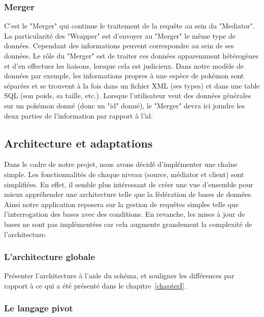 \subsubsection{Merger}
C'est le "Merger" qui continue le traitement de la requête au sein du "Mediator". La particularité des "Wrapper" est d'envoyer au "Merger" le même type de données. Cependant des informations peuvent correspondre au sein de ses données. Le rôle du "Merger" est de traiter ces données apparemment hétérogènes et d'en effectuer les liaisons, lorsque cela est judicieux. Dans notre modèle de données par exemple, les informations propres à une espèce de pokémon sont séparées et se trouvent à la fois dans un fichier XML (ses types) et dans une table SQL (son poids, sa taille, etc.). Lorsque l'utilisateur veut des données générales sur un pokémon donné (donc un "id" donné), le "Merger" devra ici joindre les deux parties de l'information par rapport à l'id. 

\subsection{Architecture et adaptations}

Dans le cadre de notre projet, nous avons décidé d'implémenter une chaîne simple. Les fonctionnalités de chaque niveau (source, médiator et client) sont simplifiées. En effet, il semble plus intéressant de créer une vue d'ensemble pour mieux appréhender une architecture telle que la fédération de bases de données. Ainsi notre application reposera sur la gestion de requêtes simples telle que l'interrogation des bases avec des conditions. En revanche, les mises à jour de bases ne sont pas implémentées car cela augmente grandement la complexité de l'architecture.

\subsubsection{L'architecture globale}


Présenter l'architecture à l'aide du schéma, et souligner les différences par rapport à ce qui a été présenté dans le chapitre~\ref{chapterI}.

\subsubsection{Le langage pivot}
\label{langagePivot}

